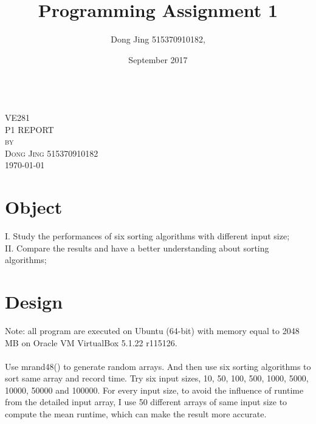 \documentclass{article}
\title{Programming Assignment 1}
\author{Dong Jing 515370910182,}
\date{September 2017}
\begin{document}
\begin{titlepage}

\begin{center}


\textsc{\LARGE }
 \\[3cm]

\textsc{\LARGE VE281}\\[5cm]

\textsc{\Large P1 REPORT}\\[5cm]


\textsc{by}\\[1cm]
\textsc{\Large Dong Jing 515370910182}\\[0.5cm]



{\large \today}

\end{center}

\end{titlepage}
\section{Object}
I. Study the performances of six sorting algorithms with different input size;\\
II. Compare the results and have a better understanding about sorting algorithms;\\
\section{Design}
Note: all program are executed on Ubuntu (64-bit) with memory equal to 2048 MB on Oracle VM VirtualBox 5.1.22 r115126.\\
\\
Use mrand48() to generate random arrays. And then use six sorting algorithms to sort same array and record time. Try six input sizes, 10, 50, 100, 500, 1000, 5000, 10000, 50000 and 100000. For every input size, to avoid the influence of runtime from the detailed input array, I use 50 different arrays of same input size to compute the mean runtime, which can make the result more accurate.\\
\end{document}
